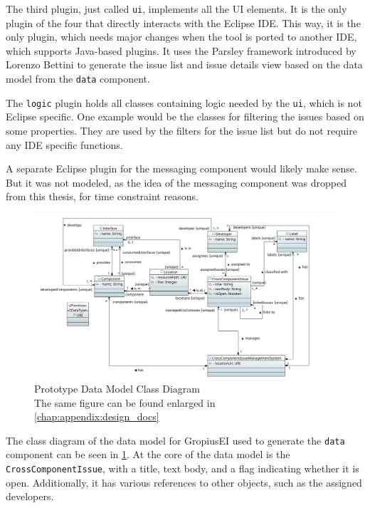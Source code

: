 The third plugin, just called \lstinline|ui|, implements all the \gls{UI} elements.
It is the only plugin of the four that directly interacts with the \gls{Eclipse} \gls{IDE}.
This way, it is the only plugin, which needs major changes when the tool is ported to another \gls{IDE}, which supports Java-based plugins.
It uses the \gls{Parsley} framework introduced by Lorenzo Bettini \cite{bettini2014developing} to generate the issue list and issue details view 
based on the data model from the \lstinline|data| component.

The \lstinline|logic| plugin holds all classes containing logic needed by the \lstinline|ui|, which is not \gls{Eclipse} specific.
One example would be the classes for filtering the issues based on some properties.
They are used by the filters for the issue list but do not require any \gls{IDE} specific functions.

A separate \gls{Eclipse} plugin for the messaging component would likely make sense.
But it was not modeled, as the idea of the messaging component was dropped from this thesis, for time constraint reasons.

\begin{figure}[!h]
	\centering
	\includegraphics[width=\textwidth]{graphics/dataClassDiagram.png}
	\caption{Prototype Data Model Class Diagram \\ \footnotesize{The same figure can be found enlarged in \cref{chap:appendix:design_docs}}}
	\label{fig:c4:data_class_diagram}
\end{figure}
The class diagram of the data model for \gls{GropiusEI} used to generate the \lstinline|data| component can be seen in \cref{fig:c4:data_class_diagram}.
At the core of the data model is the \lstinline|CrossComponentIssue|, with a title, text body, and a flag indicating whether it is open.
Additionally, it has various references to other objects, such as the assigned developers.

